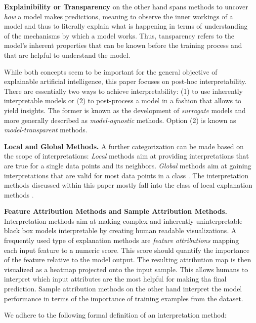 \documentclass[sigconf]{acmart}
\newcommand{\mypar}[1]{\vspace{0.2cm}\noindent\textbf{#1}}
\begin{document}
\mypar{Explainibility or Transparency} on the other hand spans methods to uncover \textit{how} a model makes predictions, meaning to observe the inner workings of a model and thus to literally explain what is happening in terms of understanding of the mechanisms by which a model works. Thus, tansparency refers to the model's inherent properties that can be known before the training process and that are helpful to understand the model.

\par\smallskip\vspace*{-0.1cm}
While both concepts seem to be important for the general objective of explainable artificial intelligence, this paper focuses on post-hoc interpretability.
There are essentially two ways to achieve interpretability: (1) to use inherently interpretable models or (2) to post-process a model in a fashion that allows to yield insights. The former is known as the development of \textit{surrogate} models and more generally described as \textit{model-agnostic} methods. Option (2) is known as \textit{model-transparent} methods. 

\mypar{Local and Global Methods.} A further categorization can be made based on the scope of interpretations: \textit{Local} methods aim at providing interpretations that are true for a single data points and its neighbors. 
\textit{Global} methods aim at gaining interpretations that are valid for most data points in a class \cite{kim2018interpretability, nguyen2017plug, yosinski2015understanding}. The interpretation methods discussed within this paper mostly fall into the class of local explanation methods \cite{ribeiro2016should, lundberg2017unified, bach2015pixel}.

\mypar{Feature Attribution Methods and Sample Attribution Methods. } Interpretation methods aim at making complex and inherently uninterpretable black box models interpretable by creating human readable visualizations. 
A frequently used type of explanation methods are \textit{feature attributions} mapping each input feature to a numeric score. This score should quantify the importance of the feature relative to the model output. The resulting attribution map is then visualized as a heatmap projected onto the input sample. This allows humans to interpret which input attributes are the most helpful for making tha final prediction. Sample attribution methods on the other hand interpret the model performance in terms of the importance of training examples from the dataset. 

We adhere to the following formal definition of an interpretation method:\newline
\end{document}
